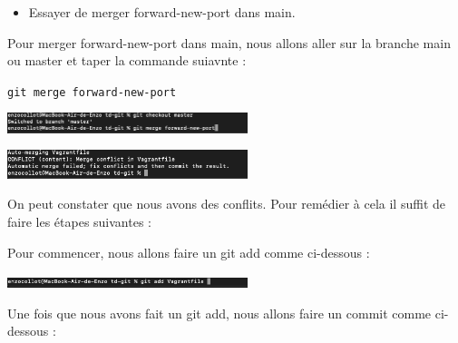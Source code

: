 \documentclass[12pt]{article}
\begin{document}
\vspace{0.3cm}

\begin{itemize}
  \item Essayer de merger forward-new-port dans main.
\end{itemize}

\vspace{0.3cm}

Pour merger forward-new-port dans main, nous allons aller sur la branche main ou master et taper la commande suiavnte : 

\texttt{git merge forward-new-port}

\vspace{0.3cm}

\begin{center}
  \includegraphics[width=7cm]{Image-TD-Git-4/git-merge.png}
\end{center}

\vspace{0.3cm}

\begin{center}
  \includegraphics[width=7cm]{Image-TD-Git-4/Conflits.png}
\end{center}

\vspace{0.3cm}

On peut constater que nous avons des conflits. Pour remédier à cela il suffit de faire les étapes suivantes : 

\vspace{0.3cm}

Pour commencer, nous allons faire un git add comme ci-dessous : 

\vspace{0.3cm}

\begin{center}
  \includegraphics[width=7cm]{Image-TD-Git-4/git add.png}
\end{center}

\vspace{0.3cm}

Une fois que nous avons fait un git add, nous allons faire un commit comme ci-dessous : 
\end{document}
